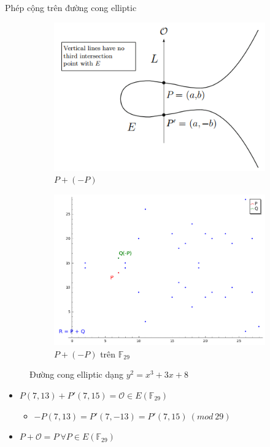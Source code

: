 \documentclass[compress]{beamer}
\begin{document}
\begin{frame}{Phép cộng trên đường cong elliptic}
\begin{figure}[h]
\begin{subfigure}{.5\textwidth}
  \centering
  \includegraphics[width=1\linewidth]{../im4.png}
  \caption{$P + (-P)$}
  \label{fig:sfig1}
\end{subfigure}%
\begin{subfigure}{.5\textwidth}
  \centering
  \includegraphics[width=1\linewidth]{../im15.png}
  \caption{$P + (-P)$ trên $\mathbb{F}_{29}$}
  \label{fig:sfig2}
\end{subfigure}
\caption*{Đường cong elliptic dạng $y^2 = x^3 + 3x + 8$}
\label{fig:fig}
\end{figure}
\begin{itemize}
\item \small{$P(7 ,13) + P'(7, 15) = \mathcal{O} \in E(\mathbb{F}_{29})$}
\begin{itemize}
\item \small{$-P(7, 13) = P'(7, -13) = P'(7, 15) \ (mod \ 29)$}
\end{itemize}
\item \small{$P + \mathcal{O} = P \ \forall P \in E(\mathbb{F}_{29})$}
\end{itemize}
\end{frame}
\end{document}
